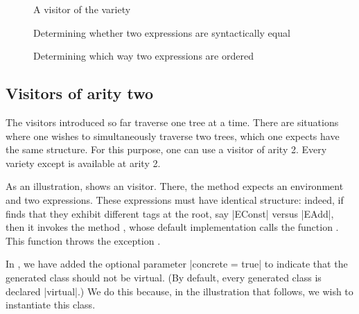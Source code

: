 \documentclass[11pt,a4paper,twoside]{article}
\begin{document}

\begin{figure}[p]
\vspace{-\baselineskip}
\caption{A visitor of the \itertwo variety}
\label{fig:expr02}
\end{figure}

\begin{figure}[p]
\caption{Determining whether two expressions are syntactically equal}
\label{fig:expr05}
\end{figure}

\begin{figure}[p]
\caption{Determining which way two expressions are ordered}
\label{fig:expr05lexico}
\end{figure}

\subsection{Visitors of arity two}
\label{sec:intro:aritytwo}

The visitors introduced so far traverse one tree at a time. There are
situations where one wishes to simultaneously traverse two trees, which one
expects have the same structure. For this purpose, one can use a visitor of
arity 2. Every variety except \mapendo is available at arity 2.

As an illustration,  shows an \itertwo visitor. There, the
method  expects an environment and two expressions. These
expressions must have identical structure: indeed, if 
finds that they exhibit different tags at the root, say \oc|EConst| versus
\oc|EAdd|, then it invokes the method , whose default
implementation calls the function . This function
throws the exception .

In , we have added the optional parameter
%
\oc|concrete = true|
%
to indicate that the generated class should not be virtual. (By default,
every generated class is declared \oc|virtual|.) We do this because, in
the illustration that follows, we wish to instantiate this class.
\end{document}

